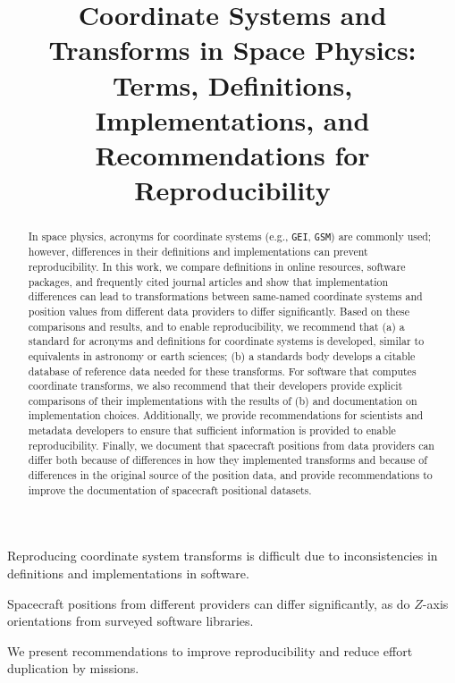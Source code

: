 \documentclass[draft]{agujournal2019}
\begin{document}
\title{Coordinate Systems and Transforms in Space Physics: Terms, Definitions, Implementations, and Recommendations for Reproducibility}


\noindent


\begin{keypoints}
\item Reproducing coordinate system transforms is difficult due to inconsistencies in definitions and implementations in software.
\item Spacecraft positions from different providers can differ significantly, as do $Z$-axis orientations from surveyed software libraries.
\item We present recommendations to improve reproducibility and reduce effort duplication by missions.
\end{keypoints}

\begin{abstract}
In space physics, acronyms for coordinate systems (e.g., \texttt{GEI}, \texttt{GSM}) are commonly used; however, differences in their definitions and implementations can prevent reproducibility. In this work, we compare definitions in online resources, software packages, and frequently cited journal articles and show that implementation differences can lead to transformations between same-named coordinate systems and position values from different data providers to differ significantly. Based on these comparisons and results, and to enable reproducibility, we recommend that (a) a standard for acronyms and definitions for coordinate systems is developed, similar to equivalents in astronomy or earth sciences; (b) a standards body develops a citable database of reference data needed for these transforms. For software that computes coordinate transforms, we also recommend that their developers provide explicit comparisons of their implementations with the results of (b) and documentation on implementation choices. Additionally, we provide recommendations for scientists and metadata developers to ensure that sufficient information is provided to enable reproducibility. Finally, we document that spacecraft positions from data providers can differ both because of differences in how they implemented transforms and because of differences in the original source of the position data, and provide recommendations to improve the documentation of spacecraft positional datasets.

\end{abstract}
\end{document}
